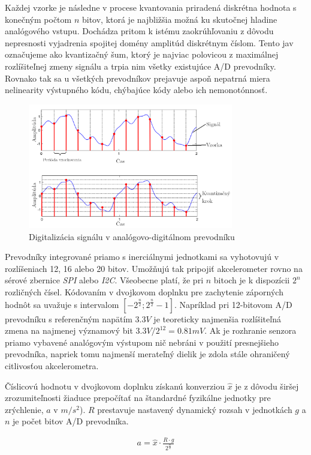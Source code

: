 Každej vzorke je následne v procese kvantovania priradená diskrétna hodnota s konečným počtom $n$ bitov, ktorá je najbližšia možná ku 
skutočnej hladine analógového vstupu. Dochádza pritom k istému zaokrúhľovaniu z dôvodu nepresnosti vyjadrenia spojitej domény amplitúd 
diskrétnym číslom. Tento jav označujeme ako kvantizačný šum, ktorý je najviac polovicou z maximálnej rozlíšiteľnej zmeny signálu a 
trpia nim všetky existujúce A/D prevodníky. Rovnako tak sa u všetkých prevodníkov prejavuje aspoň nepatrná miera nelinearity výstupného 
kódu, chýbajúce kódy alebo ich nemonotónnosť.

\begin{figure}[h]
	\centering
	\includegraphics[width=0.8\textwidth]{figures/analog-to-digital-conversion.png}
	\caption{Digitalizácia signálu v analógovo-digitálnom prevodníku}
\end{figure}

Prevodníky integrované priamo s inerciálnymi jednotkami sa vyhotovujú v rozlíšeniach 12, 16 alebo 20 bitov. Umožňujú tak pripojiť akcelerometer rovno na sérové zbernice \emph{SPI} alebo \emph{I2C}. Všeobecne platí, že pri $n$ bitoch je k dispozícii $2^n$ rozličných čísel. Kódovaním v dvojkovom doplnku pre zachytenie záporných hodnôt sa uvažuje s intervalom $[-2^\frac{n}{2}; 2^\frac{n}{2} - 1]$. Napríklad pri 12-bitovom A/D prevodníku s referenčným napätím $3.3V$ je teoreticky najmenšia rozlíšiteľná zmena na najmenej významový bit $3.3V / 2^{12} = 0.81 mV$. Ak je rozhranie senzora priamo vybavené analógovým výstupom nič nebráni v použití presnejšieho prevodníka, napriek tomu najmenší merateľný dielik je zdola stále ohraničený citlivosťou akcelerometra. 

Číslicovú hodnotu v dvojkovom doplnku získanú konverziou $\hat{x}$ je z dôvodu širšej zrozumiteľnosti žiaduce prepočítať na štandardné fyzikálne jednotky pre zrýchlenie, $a$ v $m/s^2$). $R$ prestavuje nastavený dynamický rozsah v jednotkách $g$ a $n$ je počet bitov A/D prevodníka.
\begin{ceqn}\begin{align}
   a = \hat{x} \cdot \frac{R \cdot g}{2^\frac{n}{2}}
\end{align}\end{ceqn}

